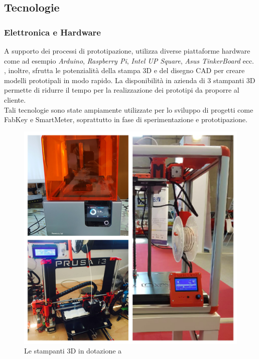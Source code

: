 \subsection{Tecnologie}

\subsubsection{Elettronica e Hardware}
A supporto dei processi di prototipazione, \lab{} utilizza diverse piattaforme hardware come ad esempio \textit{Arduino}, \textit{Raspberry Pi}, \textit{Intel UP Square}, \textit{Asus TinkerBoard} ecc.\\
\lab{}, inoltre, sfrutta le potenzialità della stampa 3D e del disegno CAD per creare modelli prototipali in modo rapido. La disponibilità in azienda di 3 stampanti 3D permette di ridurre il tempo per la realizzazione dei prototipi da proporre al cliente.\\
Tali tecnologie sono state ampiamente utilizzate per lo sviluppo di progetti come FabKey e SmartMeter, soprattutto in fase di sperimentazione e prototipazione.

\begin{figure}[H]
	\begin{center}
	\includegraphics[scale=0.07]{immagini/stampanti.jpg}
	\caption{Le stampanti 3D in dotazione a \lab{}}
	\end{center}
\end{figure}

